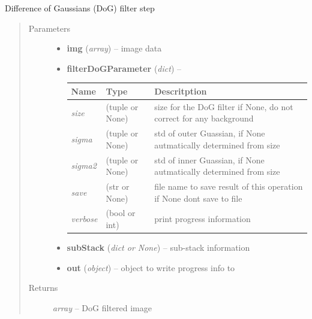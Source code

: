 \documentclass[letterpaper,10pt,english]{sphinxmanual}
\begin{document}
\begin{fulllineitems}
\label{api/ClearMap.ImageProcessing.Filter:ClearMap.ImageProcessing.Filter.DoGFilter.filterDoG}
Difference of Gaussians (DoG) filter step
\begin{quote}\begin{description}
\item[{Parameters}] \leavevmode\begin{itemize}
\item {} 
\textbf{img} (\emph{array}) --
image data

\item {} 
\textbf{filterDoGParameter} (\emph{dict}) --

\begin{tabulary}{\linewidth}{|L|L|L|}
\hline
\textsf{\relax 
Name
} & \textsf{\relax 
Type
} & \textsf{\relax 
Descritption
}\\
\hline
\emph{size}
 & 
(tuple or None)
 & 
size for the DoG filter
if None, do not correct for any background
\\
\hline
\emph{sigma}
 & 
(tuple or None)
 & 
std of outer Guassian, if None autmatically determined from size
\\
\hline
\emph{sigma2}
 & 
(tuple or None)
 & 
std of inner Guassian, if None autmatically determined from size
\\
\hline
\emph{save}
 & 
(str or None)
 & 
file name to save result of this operation
if None dont save to file
\\
\hline
\emph{verbose}
 & 
(bool or int)
 & 
print progress information
\\
\hline\end{tabulary}


\item {} 
\textbf{subStack} (\emph{dict or None}) --
sub-stack information

\item {} 
\textbf{out} (\emph{object}) --
object to write progress info to

\end{itemize}

\item[{Returns}] \leavevmode
\emph{array} --
DoG filtered image

\end{description}\end{quote}

\end{fulllineitems}
\end{document}
